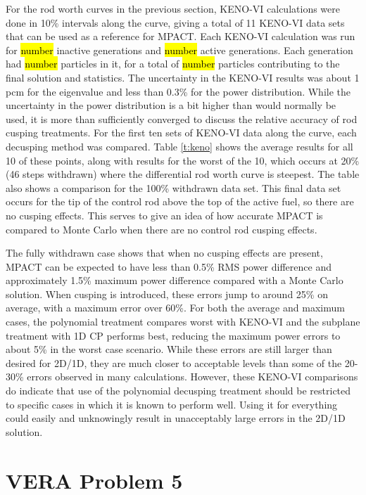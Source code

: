 For the rod worth curves in the previous section, KENO-VI calculations were done in 10\% intervals along the curve, giving a total of 11 KENO-VI data sets that can be used as a reference for MPACT.  Each KENO-VI calculation was run for \hl{number} inactive generations and \hl{number} active generations.  Each generation had \hl{number} particles in it, for a total of \hl{number} particles contributing to the final solution and statistics.  The uncertainty in the KENO-VI results was about 1 pcm for the eigenvalue and less than 0.3\% for the power distribution.  While the uncertainty in the power distribution is a bit higher than would normally be used, it is more than sufficiently converged to discuss the relative accuracy of rod cusping treatments.  For the first ten sets of KENO-VI data along the curve, each decusping method was compared.  Table \ref{t:keno} shows the average results for all 10 of these points, along with results for the worst of the 10, which occurs at 20\% (46 steps withdrawn) where the differential rod worth curve is steepest.  The table also shows a comparison for the 100\% withdrawn data set.  This final data set occurs for the tip of the control rod above the top of the active fuel, so there are no cusping effects.  This serves to give an idea of how accurate MPACT is compared to Monte Carlo when there are no control rod cusping effects.

The fully withdrawn case shows that when no cusping effects are present, MPACT can be expected to have less than 0.5\% RMS power difference and approximately 1.5\% maximum power difference compared with a Monte Carlo solution.  When cusping is introduced, these errors jump to around 25\% on average, with a maximum error over 60\%.  For both the average and maximum cases, the polynomial treatment compares worst with KENO-VI and the subplane treatment with 1D CP performs best, reducing the maximum power errors to about 5\% in the worst case scenario.  While these errors are still larger than desired for 2D/1D, they are much closer to acceptable levels than some of the 20-30\% errors observed in many calculations.  However, these KENO-VI comparisons do indicate that use of the polynomial decusping treatment should be restricted to specific cases in which it is known to perform well.  Using it for everything could easily and unknowingly result in unacceptably large errors in the 2D/1D solution.

\section{VERA Problem 5}

